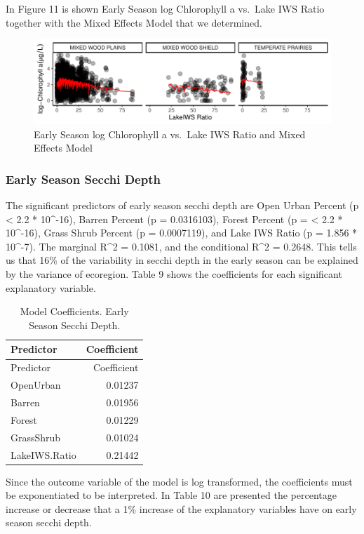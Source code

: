\documentclass[12pt,]{article}
\begin{document}
In Figure 11 is shown Early Season log Chlorophyll a vs.~Lake IWS Ratio
together with the Mixed Effects Model that we determined.

\begin{figure}
\centering
\includegraphics{Bollt_Greif_Raby_Roth_Project_Final_files/figure-latex/unnamed-chunk-20-1.pdf}
\caption{Early Season log Chlorophyll a vs.~Lake IWS Ratio and Mixed
Effects Model}
\end{figure}

\hypertarget{early-season-secchi-depth}{%
\subsubsection{Early Season Secchi
Depth}\label{early-season-secchi-depth}}

The significant predictors of early season secchi depth are Open Urban
Percent (p \textless{} 2.2 * 10\^{}-16), Barren Percent (p = 0.0316103),
Forest Percent (p = \textless{} 2.2 * 10\^{}-16), Grass Shrub Percent (p
= 0.0007119), and Lake IWS Ratio (p = 1.856 * 10\^{}-7). The marginal
R\^{}2 = 0.1081, and the conditional R\^{}2 = 0.2648. This tells us that
16\% of the variability in secchi depth in the early season can be
explained by the variance of ecoregion. Table 9 shows the coefficients
for each significant explanatory variable.

\begin{longtable}[]{@{}lr@{}}
\caption{Model Coefficients. Early Season Secchi Depth.}\tabularnewline
\toprule
Predictor & Coefficient\tabularnewline
\midrule
\endfirsthead
\toprule
Predictor & Coefficient\tabularnewline
\midrule
\endhead
OpenUrban & 0.01237\tabularnewline
Barren & 0.01956\tabularnewline
Forest & 0.01229\tabularnewline
GrassShrub & 0.01024\tabularnewline
LakeIWS.Ratio & 0.21442\tabularnewline
\bottomrule
\end{longtable}

Since the outcome variable of the model is log transformed, the
coefficients must be exponentiated to be interpreted. In Table 10 are
presented the percentage increase or decrease that a 1\% increase of the
explanatory variables have on early season secchi depth.
\end{document}
